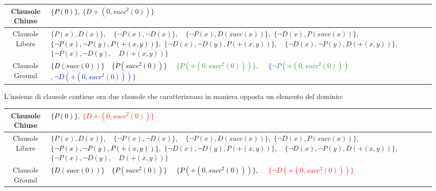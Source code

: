 \documentclass[a4paper,10pt]{article}
\begin{document}
\begin{table}[h]
    \centering
    \small 
    \renewcommand{\arraystretch}{1.5} 
    
    \begin{tabularx}{\textwidth}{|c|>{\centering\arraybackslash}X|}
        \hline
        Clausole Chiuse & \textcolor{black}{$\{P(0)\}$}$, \ \{D+(0,succ^2(0))\}$ \\
        \hline
        Clausole Libere & 
            $\{P(x), D(x)\},\quad \{\lnot P(x), \lnot D(x)\},\quad \{\lnot P(x), D(succ(x))\},$\newline
            $\{\lnot D(x), P(succ(x))\},\quad $\textcolor{black}{$\{\lnot P(x), \lnot P(y), P(+(x, y))\}$}$,$\newline
            $\{\lnot D(x), \lnot D(y), P(+(x, y))\},\quad \{\lnot D(x), \lnot P(y), D(+(x, y))\},$\newline
            $\{\lnot P(x), \lnot D(y),\quad D(+(x, y))\}$ 
            \\
        \hline
        Clausole Ground & \textcolor{black}{$\{D(succ(0))\}\quad$}\textcolor{black}{$\{P(succ^2(0))\}\quad$}
        \textcolor{ForestGreen}{$\{P(+(0, succ^2(0)))\},\quad$}
        \textcolor{blue}{$\{$\sout{\textcolor{ForestGreen}{$\lnot P(+(0, succ^2(0)))$}}$,\lnot D(+(0, succ^2(0)))\}$}
        \\
        \hline
    \end{tabularx}
\end{table}

L'insieme di clausole contiene ora due clausole che caratterizzano in maniera opposta un elemento del dominio:

\begin{table}[H]
    \centering
    \small 
    \renewcommand{\arraystretch}{1.5} 
    
    \begin{tabularx}{\textwidth}{|c|>{\centering\arraybackslash}X|}
        \hline
        Clausole Chiuse & \textcolor{black}{$\{P(0)\}$}$, \ $\textcolor{red}{$\{D+(0,succ^2(0))\}$} \\
        \hline
        Clausole Libere & 
            $\{P(x), D(x)\},\quad \{\lnot P(x), \lnot D(x)\},\quad \{\lnot P(x), D(succ(x))\},$\newline
            $\{\lnot D(x), P(succ(x))\},\quad $\textcolor{black}{$\{\lnot P(x), \lnot P(y), P(+(x, y))\}$}$,$\newline
            $\{\lnot D(x), \lnot D(y), P(+(x, y))\},\quad \{\lnot D(x), \lnot P(y), D(+(x, y))\},$\newline
            $\{\lnot P(x), \lnot D(y),\quad D(+(x, y))\}$ 
            \\
        \hline
        Clausole Ground & \textcolor{black}{$\{D(succ(0))\}\quad$}\textcolor{black}{$\{P(succ^2(0))\}\quad$}
        \textcolor{black}{$\{P(+(0, succ^2(0)))\},\quad$}
        \textcolor{red}{$\{\lnot D(+(0, succ^2(0)))\}$}
        \\
        \hline
    \end{tabularx}
\end{table}
\end{document}
